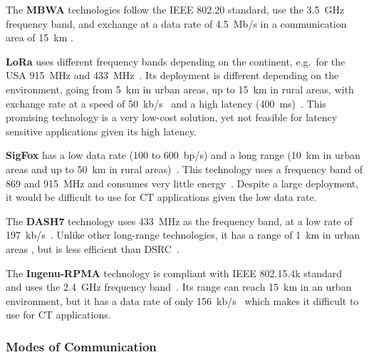 The \textbf{\acrfull{MBWA}} technologies follow the IEEE 802.20 standard, use the 3.5~GHz frequency band, and exchange at a data rate of 4.5~Mb/s in a communication area of 15~km \cite{anwer_survey_2014}.


\textbf{\acrfull{LoRa}} uses different frequency bands depending on the continent, e.g.\ for the USA 915~MHz and 433~MHz~\cite{li_lora_2018}. Its deployment is different depending on the environment, going from 5~km in urban areas, up to 15~km in rural areas, with exchange rate at a speed of 50~kb/s~\cite{foubert_long-range_2020, queralta_comparative_2019} and a high latency (400~ms)~\cite{potsch_towards_2019}. This promising technology is a very low-cost solution, yet not feasible for latency sensitive applications given its high latency.

\textbf{SigFox} has a low data rate (100 to 600~bp/s) and a long range (10~km in urban areas and up to 50~km in rural areas)~\cite{potsch_towards_2019}. This technology uses a frequency band of 869 and 915~MHz and consumes very little energy~\cite{akpakwu_survey_2018}. Despite a large deployment, it would be difficult to use for \acrshort{CT} applications given the low data rate. 

The \textbf{DASH7} technology uses 433~MHz as the frequency band, at a low rate of 197~kb/s~\cite{akpakwu_survey_2018}. Unlike other long-range technologies, it has a range of 1~km in urban areas
, but is less efficient than \acrshort{DSRC}~\cite{foubert_long-range_2020}.

The \textbf{Ingenu-RPMA} technology is compliant with IEEE 802.15.4k standard~\cite{akpakwu_survey_2018} and uses the 2.4~GHz frequency band~\cite{foubert_long-range_2020}. 
Its range can reach 15~km in an urban environment, but it has a data rate of only 156~kb/s~\cite{foubert_long-range_2020} which makes it difficult to use for \acrshort{CT} applications. %


\subsubsection{Modes of Communication}
 
